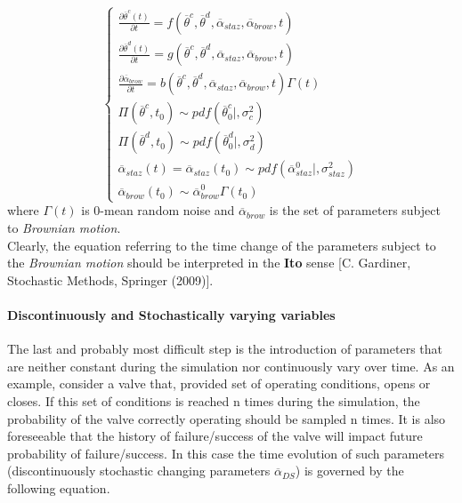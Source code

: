 \begin{equation}
\label{eq:systemThetaContAndDescreteStazAndBrow}
\left\{\begin{matrix}
\frac{\partial  \overline{\theta}^{c}\left ( t \right )}{\partial t}=f\left ( \overline{\theta}^{c},\overline{\theta}^{d}, \overline{\alpha}_{staz} ,\overline{\alpha}_{brow},      t \right ) \\ 
\frac{\partial  \overline{\theta}^{d}\left ( t \right )}{\partial t}=g\left ( \overline{\theta}^{c},\overline{\theta}^{d},\overline{\alpha}_{staz},\overline{\alpha}_{brow},t \right )\\
\frac{\partial \overline{\alpha}_{brow} }{\partial t}=b\left ( \overline{\theta}^{c},\overline{\theta}^{d},\overline{\alpha}_{staz},\overline{\alpha}_{brow},t \right )\Gamma \left ( t \right )
\\
\Pi \left ( \overline{\theta}^{c},t_{0} \right ) \sim pdf\left ( \overline{\theta}^{c}_{0}|,\sigma_{c}^{2} \right )\\ 
\Pi \left ( \overline{\theta}^{d},t_{0} \right ) \sim pdf\left ( \overline{\theta}^{d}_{0}|,\sigma_{d}^{2} \right ) \\
\overline{\alpha}_{staz}\left ( t \right )=\overline{\alpha}_{staz}\left ( t_{0} \right ) \sim pdf\left ( \overline{\alpha}_{staz}^{0}|, \sigma_{staz}^{2} \right ) \\
\overline{\alpha}_{brow}\left ( t_{0} \right ) \sim  \overline{\alpha}_{brow}^{0} \Gamma \left ( t_{0} \right )
\end{matrix}\right.
\end{equation}
where $\Gamma \left ( t \right )$ is 0-mean random noise and $\overline{\alpha}_{brow}$ is the set of parameters subject to \textit{Brownian motion}.
\\Clearly, the equation referring to the time change of the parameters subject to the \textit{Brownian motion} should be interpreted in the \textbf{Ito} sense [C. Gardiner, Stochastic Methods, Springer (2009)].

\paragraph{Discontinuously and Stochastically varying variables}
The last and probably most difficult step is the introduction of parameters that are neither constant during the simulation nor continuously vary over time. As an example, consider a valve that, provided set of operating conditions, opens or closes. If this set of conditions is reached n times during the simulation, the probability of the valve correctly operating should be sampled n times. It is also foreseeable that the history of failure/success of the valve will impact future probability of failure/success.  In this case the time evolution of such parameters (discontinuously stochastic changing parameters  $\overline{\alpha}_{DS}$) is governed by the following equation.

